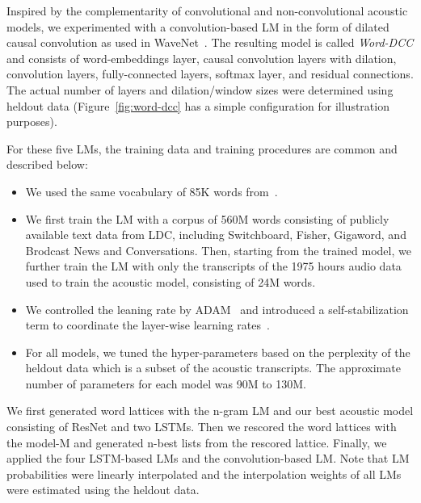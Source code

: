 \documentclass[a4paper]{article}
\begin{document}
Inspired by the complementarity of convolutional and non-convolutional
acoustic models, we experimented with a convolution-based LM in the
form of dilated causal convolution as used in {\sc
  WaveNet}~\cite{oord2016wavenet}. The resulting model is called {\it
  Word-DCC} and consists of word-embeddings layer, causal convolution
layers with dilation, convolution layers, fully-connected layers,
softmax layer, and residual connections.  The actual number of layers
and dilation/window sizes were determined using heldout data
(Figure~\ref{fig:word-dcc} has a simple configuration for
illustration purposes).

For these five LMs, the training data and training procedures are common and described below:
\begin{itemize}
 \item We used the same vocabulary of 85K words from~\cite{saon16}.
 \item We first train the LM with a corpus of 560M words consisting of publicly available text data from LDC, including Switchboard, Fisher, Gigaword, and Brodcast News and Conversations. Then, starting from the trained model, we further train the LM with only the transcripts of the 1975 hours audio data used to train the acoustic model, consisting of 24M words.
 \item We controlled the leaning rate by ADAM~\cite{kingma2014adam} and introduced a self-stabilization term to coordinate the layer-wise learning rates~\cite{ghahremani16:_self}.
 \item For all models, we tuned the hyper-parameters based on the perplexity of the heldout data which is a subset of the acoustic transcripts. The approximate number of parameters for each model was 90M to 130M.
\end{itemize}

We first generated word lattices with the n-gram LM and our best acoustic model consisting of ResNet and two LSTMs.
Then we rescored the word lattices with the model-M and generated n-best lists from the rescored lattice.
Finally, we applied the four LSTM-based LMs and the convolution-based LM.
Note that LM probabilities were linearly interpolated and the interpolation weights of all LMs were estimated using the heldout data.
\end{document}
